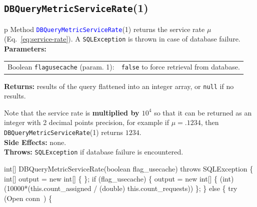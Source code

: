 \subsection{\texttt{DBQueryMetricServiceRate}(1)}
\begin{tabular}{p{\textwidth}}
\toprule
{}
Method \textcolor{blue}{{\tt{}\protect{}DBQueryMetricServiceRate}}(1) returns the
service rate $\mu$ (Eq.~\ref{eq:service-rate}).
A {\tt{}SQLException} is thrown in case of database failure.\\
\midrule
\textbf{Parameters:} \\
\begin{tabular}{lp{116mm}}
Boolean {\tt{}flag{\char95}usecache} (param. 1):&{\tt{}false} to force retrieval from database.\\
\end{tabular}
\textbf{Returns:} results of the query flattened into an integer array,
or {\tt{}null} if no results.


Note that the service rate is \textbf{multiplied by $10^4$} so that it can be
returned as an integer with 2 decimal points precision, for example if
$\mu=.1234$, then {\tt{}\protect{}DBQueryMetricServiceRate}(1) returns $1234$.\\
\textbf{Side Effects:} none.\\
\textbf{Throws:} {\tt{}SQLException} if database failure is encountered.\\
\bottomrule
\end{tabular}
\nwenddocs{}\endmoddef{}
int[] DBQueryMetricServiceRate(boolean flag_usecache) throws SQLException \{
  int[] output = new int[] \{ \};
  if (flag_usecache) \{
    output = new int[] \{ (int) (10000*(this.count_assigned
        / (double) this.count_requests)) \};
  \} else \{
    try (\LA{}Open \code{}conn\edoc{}~{\nwtagstyle{}}\RA{}) \{
